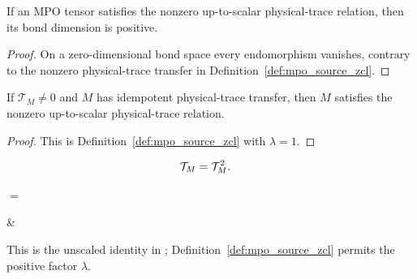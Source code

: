 \begin{lemma}
    \label{thm:mpo_source_zcl_bond_dim_ne_zero}
    \leanok
    If an MPO tensor satisfies the nonzero up-to-scalar physical-trace
    relation, then its bond dimension is positive.
\end{lemma}

\begin{proof}\leanok
    On a zero-dimensional bond space every endomorphism vanishes, contrary to
    the nonzero physical-trace transfer in
    Definition~\ref{def:mpo_source_zcl}.
\end{proof}

\begin{lemma}
    \label{thm:mpo_source_zcl_of_physical_trace_idempotent}
    \leanok
    If $\mathcal T_M\ne0$ and $M$ has idempotent physical-trace transfer, then $M$
    satisfies the nonzero up-to-scalar physical-trace relation.
\end{lemma}

\begin{proof}
    \leanok
    This is Definition~\ref{def:mpo_source_zcl} with $\lambda=1$.
\end{proof}

\begin{align}
    \mathcal T_M & =\mathcal T_M^2.
    \notag
\end{align}
\begin{center}
    \tenkzkernel
    \begin{tenkz}[rows={wire}, cols=1, west=open, east=open, trace=physical,
            physical=updown]
    \end{tenkz}
    $ = $
    \begin{tenkz}[rows={wire}, cols=2, west=open, east=open, trace=physical,
            physical=updown]
         & 
    \end{tenkz}
\end{center}
This is the unscaled identity in
\cite[Definition~4.2, lines~735--739]{Cirac2016MPDO_arXiv};
Definition~\ref{def:mpo_source_zcl} permits the positive factor $\lambda$.


